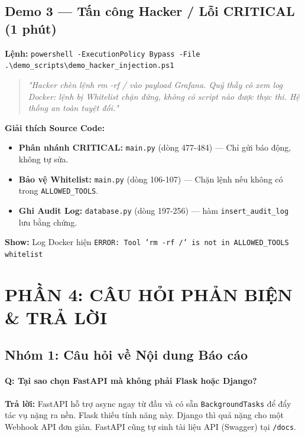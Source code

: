 \documentclass[12pt,a4paper]{article}
\begin{document}
\subsection{Demo 3 — Tấn công Hacker / Lỗi CRITICAL (1 phút)}
\textbf{Lệnh:} \texttt{powershell -ExecutionPolicy Bypass -File .\textbackslash{}demo\_scripts\textbackslash{}demo\_hacker\_injection.ps1}
\begin{quote}
    \textit{"Hacker chèn lệnh rm -rf / vào payload Grafana. Quý thầy cô xem log Docker: lệnh bị Whitelist chặn đứng, không có script nào được thực thi. Hệ thống an toàn tuyệt đối."}
\end{quote}
\textbf{Giải thích Source Code:}
\begin{itemize}
    \item \textbf{Phân nhánh CRITICAL:} \texttt{main.py} (dòng 477-484) — Chỉ gửi báo động, không tự sửa.
    \item \textbf{Bảo vệ Whitelist:} \texttt{main.py} (dòng 106-107) — Chặn lệnh nếu không có trong \texttt{ALLOWED\_TOOLS}.
    \item \textbf{Ghi Audit Log:} \texttt{database.py} (dòng 197-256) — hàm \texttt{insert\_audit\_log} lưu bằng chứng.
\end{itemize}
\textbf{Show:} Log Docker hiện \texttt{ERROR: Tool 'rm -rf /' is not in ALLOWED\_TOOLS whitelist}

\newpage

\section{PHẦN 4: CÂU HỎI PHẢN BIỆN \& TRẢ LỜI}

\subsection{Nhóm 1: Câu hỏi về Nội dung Báo cáo}

\paragraph{Q: Tại sao chọn FastAPI mà không phải Flask hoặc Django?}
\textbf{Trả lời:} FastAPI hỗ trợ async ngay từ đầu và có sẵn \texttt{BackgroundTasks} để đẩy tác vụ nặng ra nền. Flask thiếu tính năng này. Django thì quá nặng cho một Webhook API đơn giản. FastAPI cũng tự sinh tài liệu API (Swagger) tại \texttt{/docs}.
\end{document}
